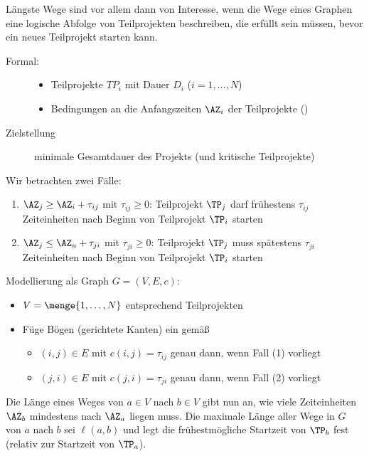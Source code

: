 Längste Wege sind vor allem dann von Interesse, wenn die Wege eines Graphen eine logische Abfolge von Teilprojekten beschreiben, die erfüllt sein müssen, bevor ein neues Teilprojekt starten kann.

\begin{description}
	\item[Formal:]
	\begin{itemize}[nolistsep, topsep=-\parskip]
		\item Teilprojekte $TP_i$ mit Dauer $D_i$ ($i = 1, \dots, N$)
		\item Bedingungen an die Anfangszeiten $\AZ_i$ der Teilprojekte ()
	\end{itemize}
	\item[Zielstellung] minimale Gesamtdauer des Projekts (und kritische Teilprojekte)
\end{description}

Wir betrachten zwei Fälle:
\begin{enumerate}[label=(\arabic*), nolistsep]
	\item $\AZ_j \ge \AZ_i + \tau_{ij}$ mit $\tau_{ij} \ge 0$: Teilprojekt $\TP_j$ darf frühestens $\tau_{ij}$ Zeiteinheiten nach Beginn von Teilprojekt $\TP_i$ starten
	\item $\AZ_j \le \AZ_u + \tau_{ji}$ mit $\tau_{ji} \ge 0$: Teilprojekt $\TP_j$ muss spätestens $\tau_{ji}$ Zeiteinheiten nach Beginn von Teilprojekt $\TP_i$ starten
\end{enumerate}

Modellierung als Graph $G = (V,E,c)$:

\begin{itemize}[nolistsep, topsep=-\parskip]
	\item $V = \menge{1, \dots, N}$ entsprechend Teilprojekten
	\item Füge Bögen (gerichtete Kanten) ein gemäß
	\begin{itemize}
		\item $(i,j) \in E$ mit $c(i,j) = \tau_{ij}$ genau dann, wenn Fall (1) vorliegt
		\item $(j,i) \in E$ mit $c(j,i) = \tau_{ji}$ genau dann, wenn Fall (2) vorliegt
	\end{itemize}
\end{itemize}

Die Länge eines Weges von $a \in V$ nach $b \in V$ gibt nun an, wie viele Zeiteinheiten $\AZ_b$ mindestens nach $\AZ_a$ liegen muss. Die maximale Länge aller Wege in $G$ von $a$ nach $b$ sei $\ell(a,b)$ und legt die frühestmögliche Startzeit von $\TP_b$ fest (relativ zur Startzeit von $\TP_a$).

